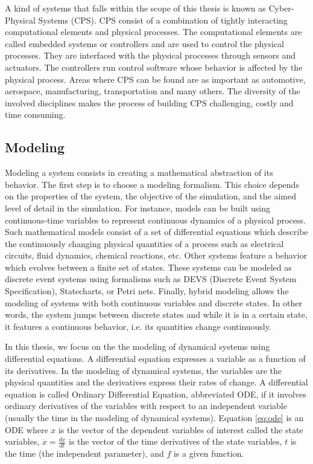 A kind of systems that falls within the scope of this thesis is known as Cyber-Physical Systems (CPS). CPS consist of a combination of tightly interacting computational elements and physical processes. The computational elements are called embedded systems or controllers and are used to control the physical processes. They are interfaced with the physical processes through sensors and actuators. The controllers run control software whose behavior is affected by the physical process. Areas where CPS can be found are as important as automotive, aerospace, manufacturing, transportation and many others. The diversity of the involved disciplines makes the process of building CPS challenging, costly and time consuming.

\subsection{Modeling}

Modeling a system consists in creating a mathematical abstraction of its behavior. The first step is to choose a modeling formalism. This choice depends on the properties of the system, the objective of the simulation, and the aimed level of detail in the simulation. For instance, models can be built using continuous-time variables to represent continuous dynamics of a physical process. Such mathematical models consist of a set of differential equations which describe the continuously changing physical quantities of a process such as electrical circuits, fluid dynamics, chemical reactions, etc. Other systems feature a behavior which evolves between a finite set of states. These systems can be modeled as discrete event systems using formalisms such as DEVS (Discrete Event System Specification), Statecharts, or Petri nets. Finally, hybrid modeling allows the modeling of systems with both continuous variables and discrete states. In other words, the system jumps between discrete states and while it is in a certain state, it features a continuous behavior, i.e. its quantities change continuously. 

In this thesis, we focus on the the modeling of dynamical systems using differential equations. A differential equation expresses a variable as a function of its derivatives. In the modeling of dynamical systems, the variables are the physical quantities and the derivatives express their rates of change. A differential equation is called Ordinary Differential Equation, abbreviated ODE, if it involves ordinary derivatives of the variables with respect to an independent variable (usually the time in the modeling of dynamical systems).  Equation \ref{eq:ode} is an ODE where $x$ is the vector of the dependent variables of interest called the state variables, $\dot{x} = \frac{dx}{dt}$ is the vector of the time derivatives of the state variables, $t$ is the time (the independent parameter), and $f$ is a given function.

